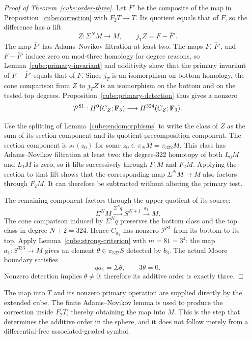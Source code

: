 \begin{proof}[Proof of Theorem~\ref{cube:order-three}]
Let \(\overline F'\) be the composite of the map in
Proposition~\ref{cube:correction} with \(F_2T\to T\).
Its quotient equals that of \(F\), so the difference
has a lift
\[
 Z:\Sigma^NM\longrightarrow M,\qquad
 j_TZ=F-\overline F'.
\]
The map \(\overline F'\) has Adams--Novikov filtration
at least two.  The maps \(F\), \(\overline F'\), and
\(F-\overline F'\) induce zero on mod-three homology for degree reasons, so
Lemma~\ref{cube:primary-invariant} and additivity
show that the primary invariant of
\(F-\overline F'\) equals that of \(F\).
Since \(j_T\) is an isomorphism on bottom homology,
the cone comparison from \(Z\) to \(j_TZ\) is an
isomorphism on the bottom and on the tested top
degrees.  Proposition~\ref{cube:primary-detection}
thus gives a nonzero
\[
 \mathcal P^{81}:H^0(C_Z;\mathbf F_3)\longrightarrow
                      H^{324}(C_Z;\mathbf F_3).
\]

Use the splitting of Lemma~\ref{cube:endomorphisms}
to write the class of \(Z\) as the sum of its
section component and its quotient-precomposition
component.  The section component is \(s_*(z_0)\)
for some \(z_0\in\pi_NM=\pi_{322}M\).
This class has Adams--Novikov filtration at
least two: the degree-322 homotopy of both
\(L_0M\) and \(L_1M\) is zero, so it lifts
successively through \(F_1M\) and \(F_2M\).
Applying the section to that lift shows that
the corresponding map \(\Sigma^NM\to M\)
also factors through \(F_2M\).
It can therefore be subtracted without
altering the primary test.

The remaining component factors through the
upper quotient of its source:
\[
 \Sigma^NM\xrightarrow{\Sigma^Nq}S^{N+1}
       \xrightarrow{a_1}M.
\]
The cone comparison induced by \(\Sigma^Nq\)
preserves the bottom class and the top class
in degree \(N+2=324\).  Hence \(C_{a_1}\)
has nonzero \(\mathcal P^{81}\) from its
bottom to its top.  Apply
Lemma~\ref{cube:strong-criterion} with
\(m=81=3^4\): the map
\(a_1:S^{323}\to M\) gives an element
\(\theta\in\pi_{322}S\) detected by \(b_3\).
The actual Moore boundary satisfies
\[
 qa_1=\Sigma\theta,\qquad 3\theta=0.
\]
Nonzero detection implies \(\theta\ne0\);
therefore its additive order is exactly three.
\end{proof}

\begin{remark}
The map into \(T\) and its nonzero primary operation
are supplied directly by the extended cube.
The finite Adams--Novikov lemma is used to produce
the correction inside \(F_2T\), thereby obtaining
the map into \(M\).  This is the step that determines
the additive order in the sphere, and it does not
follow merely from a differential-free
associated-graded symbol.
\end{remark}
